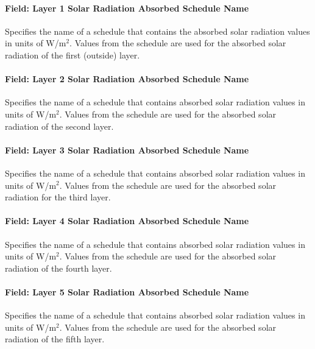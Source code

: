 \paragraph{Field: Layer 1 Solar Radiation Absorbed Schedule Name}\label{field-layer-1-solar-radiation-absorbed-schedule-name}

Specifies the name of a schedule that contains the absorbed solar radiation values in units of W/m\(^{2}\). Values from the schedule are used for the absorbed solar radiation of the first (outside) layer.

\paragraph{Field: Layer 2 Solar Radiation Absorbed Schedule Name}\label{field-layer-2-solar-radiation-absorbed-schedule-name}

Specifies the name of a schedule that contains absorbed solar radiation values in units of W/m\(^{2}\). Values from the schedule are used for the absorbed solar radiation of the second layer.

\paragraph{Field: Layer 3 Solar Radiation Absorbed Schedule Name}\label{field-layer-3-solar-radiation-absorbed-schedule-name}

Specifies the name of a schedule that contains absorbed solar radiation values in units of W/m\(^{2}\). Values from the schedule are used for the absorbed solar radiation for the third layer.

\paragraph{Field: Layer 4 Solar Radiation Absorbed Schedule Name}\label{field-layer-4-solar-radiation-absorbed-schedule-name}

Specifies the name of a schedule that contains absorbed solar radiation values in units of W/m\(^{2}\). Values from the schedule are used for the absorbed solar radiation of the fourth layer.

\paragraph{Field: Layer 5 Solar Radiation Absorbed Schedule Name}\label{field-layer-5-solar-radiation-absorbed-schedule-name}

Specifies the name of a schedule that contains absorbed solar radiation values in units of W/m\(^{2}\). Values from the schedule are used for the absorbed solar radiation of the fifth layer.

